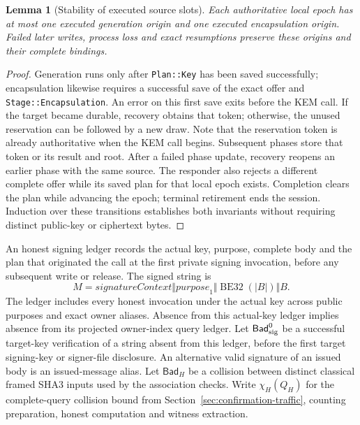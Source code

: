 \documentclass[pdflatex]{sn-jnl}
\theoremstyle{thmstyleone}
\newtheorem{lemma}[theorem]{Lemma}
\theoremstyle{thmstylethree}
\theoremstyle{thmstyletwo}
\begin{document}
\begin{lemma}[Stability of executed source slots]
\label{lem:executed-slot-stability}
Each authoritative local epoch has at most one executed generation origin
and one executed encapsulation origin. Failed later writes, process loss
and exact resumptions preserve these origins and their complete bindings.
\end{lemma}
\begin{proof}
Generation runs only after \texttt{Plan::Key} has been saved successfully;
encapsulation likewise requires a successful save of the exact offer and
\texttt{Stage::Encapsulation}. An error on this first save
exits before the KEM call. If the target became durable, recovery obtains
that token; otherwise, the unused reservation can be followed by a new
draw. Note that the reservation token is already authoritative when the
KEM call begins. Subsequent phases store that token or its result and
root. After a failed phase update, recovery reopens an earlier phase
with the same source. The responder also rejects a different complete
offer while its saved plan for that local epoch exists. Completion clears
the plan while advancing the epoch; terminal retirement ends the session.
Induction over these transitions
establishes both invariants without requiring distinct public-key or
ciphertext bytes.
\end{proof}

An honest signing ledger records the actual key, purpose, complete body
and the plan that originated the call at the first private signing invocation,
before any subsequent write or release. The signed string is
\[
 M=\mathit{signatureContext}\Vert\mathit{purpose}_{1}
       \Vert\operatorname{BE32}(|B|)\Vert B.
\]
The ledger includes every honest invocation under the actual key across
public purposes and exact owner aliases. Absence from this actual-key
ledger implies absence from its projected owner-index query ledger.
Let $\mathsf{Bad}_{\rm sig}^{0}$ be a successful target-key verification
of a string absent from this ledger, before the first target signing-key
or signer-file disclosure. An alternative valid signature of an issued
body is an issued-message alias. Let $\mathsf{Bad}_H$ be a collision
between distinct classical framed SHA3 inputs used by the association
checks. Write $\chi_H(Q_H)$ for the complete-query collision bound from
Section~\ref{sec:confirmation-traffic}, counting preparation, honest
computation and witness extraction.
\end{document}
